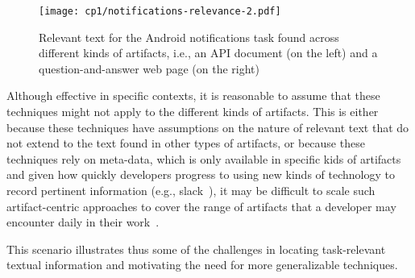 
 
 
 
 
 \begin{landscape}
 \begin{figure}
     \centering
     \texttt{[image: cp1/notifications-relevance-2.pdf]}
     \caption{Relevant text for the Android notifications task found across different kinds of artifacts, i.e., an API document (on the left) and a question-and-answer web page (on the right)}
     \label{fig:anatomy-of-relevant-text}
 \end{figure}
 \end{landscape}
 
 
 
 
 Although effective in specific contexts,
 it is reasonable to assume that these techniques might not apply 
 to the different kinds of artifacts. This is either because these techniques have  assumptions on the nature of relevant text that do
 not extend to the text found in other types of artifacts, or 
 because these techniques rely on 
 meta-data, which is only available in specific kids of artifacts
 and given how quickly developers progress to using new kinds of technology to
 record pertinent information (e.g., slack~\cite{Storey2017, Lin2016}),
 it may be difficult to scale such artifact-centric approaches to cover the range of
 artifacts that 
 a developer may encounter
 daily in their work~\cite{Li2013}.
 
 
 This scenario illustrates thus some of the challenges in locating task-relevant textual
 information and motivating the need for more generalizable techniques.
 
 

















